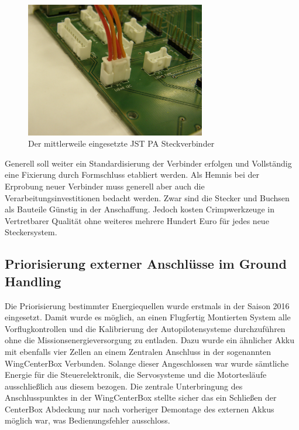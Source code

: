 \begin{figure}[H]
\centering
\includegraphics[width=0.7\textwidth]{bilder/Stecker/Stecker_JST_PA.jpg} 
\caption{Der mittlerweile eingesetzte JST PA Steckverbinder} 
\label{fig:Der mittlerweile eingesetzte JST PA Steckverbinder}
\end{figure}

Generell soll weiter ein Standardisierung der Verbinder erfolgen und Vollständig eine Fixierung durch Formschluss etabliert werden.
Als Hemnis bei der Erprobung neuer Verbinder muss generell aber auch die Verarbeitungsinvestitionen bedacht werden. Zwar sind die Stecker und Buchsen als Bauteile Günstig in der Anschaffung. Jedoch kosten Crimpwerkzeuge in Vertretbarer Qualität ohne weiteres mehrere Hundert Euro für jedes neue Steckersystem.





\subsection{Priorisierung externer Anschlüsse im Ground Handling}

Die Priorisierung bestimmter Energiequellen wurde erstmals in der Saison 2016 eingesetzt.
Damit wurde es möglich, an einen Flugfertig Montierten System alle Vorflugkontrollen und die Kalibrierung der Autopilotensysteme durchzuführen ohne die Missionsenergieversorgung zu entladen. Dazu wurde ein ähnlicher Akku mit ebenfalls vier Zellen an einem Zentralen Anschluss in der sogenannten WingCenterBox Verbunden. Solange dieser Angeschlossen war wurde sämtliche Energie für die Steuerelektronik, die Servosysteme und die Motortesläufe ausschließlich aus diesem bezogen. Die zentrale Unterbringung des Anschlusspunktes in der WingCenterBox stellte sicher das ein Schließen der CenterBox Abdeckung nur nach vorheriger Demontage des externen Akkus möglich war, was Bedienungsfehler ausschloss.

